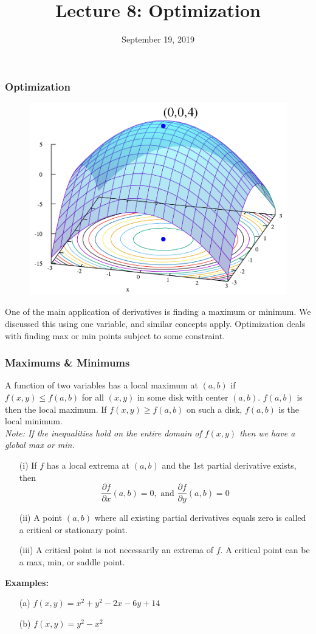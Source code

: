 \documentclass{beamer}
\title{Lecture 8: Optimization}
\date{September 19, 2019}
\begin{document}
	
\frame{\titlepage}


\begin{frame}
\frametitle{Optimization}
\begin{figure}
	\centering
	\includegraphics[height=.5\textheight]{maxpoint.png}\\
	\hspace*{10pt}\hbox{}
\end{figure}

One of the main application of derivatives is finding a maximum or minimum. We discussed this using one variable, and similar concepts apply. Optimization deals with finding max or min points subject to some constraint.
\end{frame}


\begin{frame}
\frametitle{Maximums \& Minimums}
A function of two variables has a local maximum at $(a,b)$ if $f(x,y) \leq f(a,b)$ for all $(x,y)$ in some disk with center $(a,b)$. $f(a,b)$ is then the local maximum. If $f(x,y) \geq f(a,b)$ on such a disk, $f(a,b)$ is the local minimum.\\
\textit{Note: If the inequalities hold on the entire domain of $f(x,y)$ then we have a global max or min.}
\begin{itemize}
	\item[(i)] If $f$ has a local extrema at $(a,b)$ and the 1st partial derivative exists, then 
	$$\frac{\partial f}{\partial x} (a,b) = 0, \mbox{ and } \frac{\partial f}{\partial y} (a,b) = 0$$
	\item[(ii)] A point $(a,b)$ where all existing partial derivatives equals zero is called a critical or stationary point.
	\item[(iii)] A critical point is not necessarily an extrema of $f$. A critical point can be a max, min, or saddle point.
\end{itemize}
 
\vspace{6pt}
\textbf{Examples:}
\begin{itemize}
	\item[(a)] $f(x,y) = x^2+y^2 -2x -6y + 14$
	\item[(b)] $f(x,y) = y^2-x^2$
\end{itemize}
\end{frame}
\end{document}

